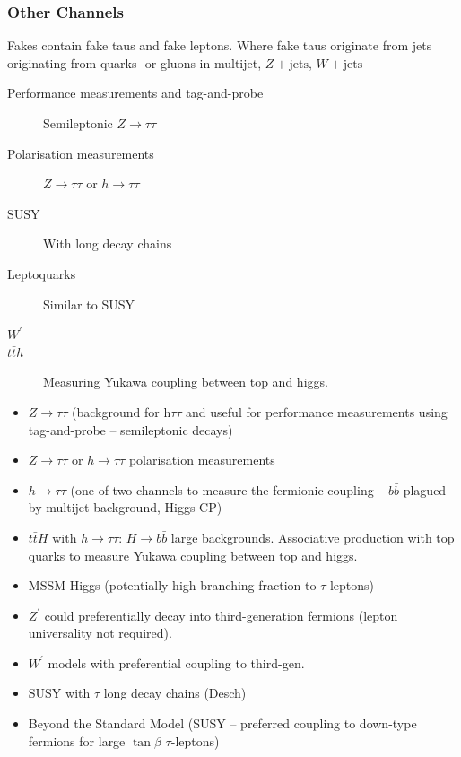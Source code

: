 \subsubsection{Other Channels}

Fakes contain fake taus and fake leptons. Where fake taus originate from jets
originating from quarks- or gluons in multijet, $Z+\text{jets}$, $W+\text{jets}$

\begin{description}
\item[Performance measurements and tag-and-probe] Semileptonic $Z \to \tau\tau$
\item[Polarisation measurements] $Z \to \tau\tau$ or $h \to \tau\tau$
\item[SUSY] With long decay chains
\item[Leptoquarks] Similar to SUSY
\item[$W^\prime$]
\item[$t\bar{t}h$] Measuring Yukawa coupling between top and higgs.
\end{description}



\begin{itemize}
  \item $Z \rightarrow \tau \tau$ (background for h$\tau \tau$ and
    useful for performance measurements using tag-and-probe -- semileptonic
    decays)

  \item $Z \to \tau\tau$ or $h \to \tau\tau$ polarisation measurements

  \item $h \rightarrow \tau \tau$ (one of two channels to measure
    the fermionic coupling -- $b \bar{b}$ plagued by multijet background,
    Higgs CP)

  \item $t\bar{t}H$ with $h \to \tau \tau$: $H \to b \bar{b}$ large backgrounds.
    Associative production with top quarks to measure Yukawa coupling between
    top and higgs.

  \item MSSM Higgs (potentially high branching fraction to $\tau$-leptons)

  \item $Z^\prime$ could preferentially decay into third-generation
    fermions (lepton universality not required).

  \item $W^\prime$ models with preferential coupling to third-gen.

  \item SUSY with $\tau$ \textrightarrow long decay chains (Desch)

  \item Beyond the Standard Model (SUSY -- preferred coupling to down-type
    fermions for large $\tan\beta$ \textrightarrow $\tau$-leptons)
\end{itemize}

